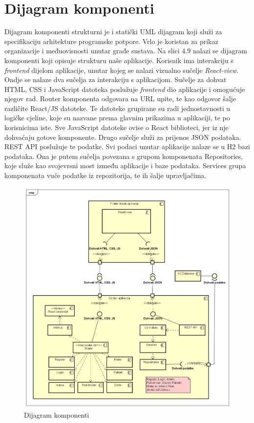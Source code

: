			\eject
		\section{Dijagram komponenti}
			\text Dijagram komponenti strukturni je i statički UML dijagram koji služi za specifikaciju arhitekture programske potpore. Vrlo je koristan za prikaz organizacije i međuovisnosti unutar građe sustava. Na slici 4.9 nalazi se dijagram komponenti koji opisuje strukturu naše aplikacije. Korisnik ima interakciju s \textit{frontend} dijelom aplikacije, unutar kojeg se nalazi vizualno sučelje \textit{React-view}. Ondje se nalaze dva sučelja za interakciju s aplikacijom. Sučelje za dohvat HTML, CSS i JavaScript datoteka poslužuje \textit{frontend} dio aplikacije i omogućuje njegov rad. Router komponenta odgovara na URL upite, te kao odgovor šalje različite React/JS datoteke. Te datoteke grupirane su radi jednostavnosti u logičke cjeline, koje su nazvane prema glavnim prikazima u aplikaciji, te po korisnicima iste. Sve JavaScript datoteke ovise o React biblioteci, jer iz nje dohvaćaju gotove komponente.
			Drugo sučelje služi za prijenos JSON podataka. REST API poslužuje te podatke. Svi podaci unutar aplikacije nalaze se u H2 bazi podataka. Ona je putem sučelja povezana s grupom komponenata Repositories, koje služe kao svojevrsni most između aplikacije i baze podataka. Services grupa komponenata vuče podatke iz repozitorija, te ih šalje upravljačima.
			\begin{figure}[H]
				\includegraphics[scale=0.5]{dijagrami/dijkomp.PNG} %
				\centering
				\caption{Dijagram komponenti}
				\label{fig:dijkomp}
			\end{figure}
			